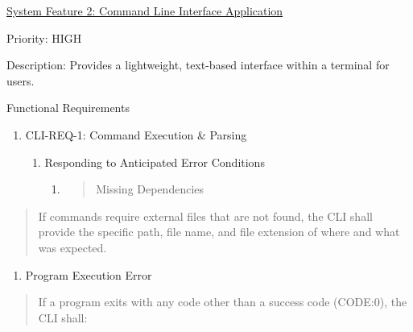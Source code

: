 \ul{System Feature 2: Command Line Interface Application}

Priority: HIGH

Description: Provides a lightweight, text-based interface within a
terminal for users.

Functional Requirements

\begin{enumerate}
\def\labelenumi{\Roman{enumi})}
\item
  CLI-REQ-1: Command Execution \& Parsing

  \begin{enumerate}
  \def\labelenumii{\alph{enumii}.}
  \item
    Responding to Anticipated Error Conditions

    \begin{enumerate}
    \def\labelenumiii{\roman{enumiii}.}
    \item
      \begin{quote}
      Missing Dependencies
      \end{quote}
    \end{enumerate}
  \end{enumerate}
\end{enumerate}

\begin{quote}
If commands require external files that are not found, the CLI shall
provide the specific path, file name, and file extension of where and
what was expected.
\end{quote}

\begin{enumerate}
\def\labelenumi{\roman{enumi}.}
\setcounter{enumi}{1}
\item
  Program Execution Error
\end{enumerate}

\begin{quote}
If a program exits with any code other than a success code (CODE:0), the
CLI shall:
\end{quote}

